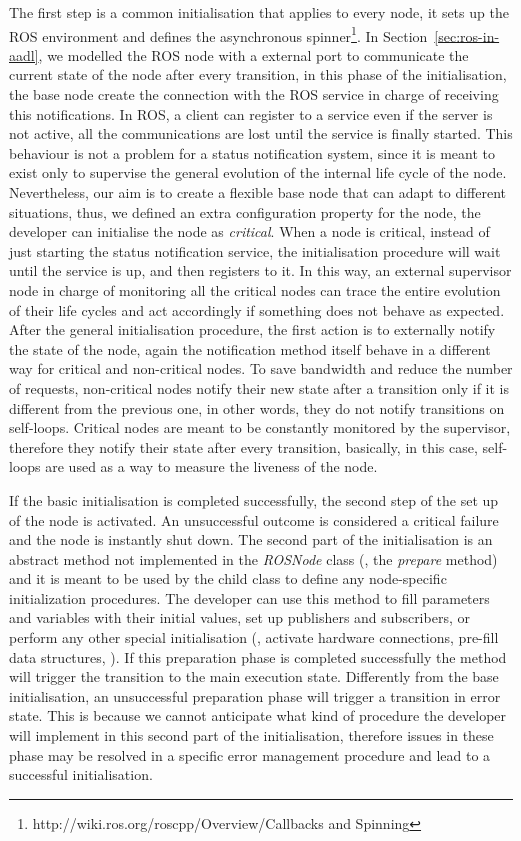 The first step is a common initialisation that applies to every node, it sets up the ROS environment and defines the asynchronous spinner\footnote{http://wiki.ros.org/roscpp/Overview/Callbacks and Spinning}. In Section~\ref{sec:ros-in-aadl}, we modelled the ROS node with a external port to communicate the current state of the node after every transition, in this phase of the initialisation, the base node create the connection with the ROS service in charge of receiving this notifications. In ROS, a client can register to a service even if the server is not active, all the communications are lost until the service is finally started. This behaviour is not a problem for a status notification system, since it is meant to exist only to supervise the general evolution of the internal life cycle of the node. Nevertheless, our aim is to create a flexible base node that can adapt to different situations, thus, we defined an extra configuration property for the node, the developer can initialise the node as \textit{critical}. When a node is critical, instead of just starting the status notification service, the initialisation procedure will wait until the service is up, and then registers to it. In this way, an external supervisor node in charge of monitoring all the critical nodes can trace the entire evolution of their life cycles and act accordingly if something does not behave as expected. After the general initialisation procedure, the first action is to externally notify the state of the node, again the notification method itself behave in a different way for critical and non-critical nodes. To save bandwidth and reduce the number of requests, non-critical nodes notify their new state after a transition only if it is different from the previous one, in other words, they do not notify transitions on self-loops. Critical nodes are meant to be constantly monitored by the supervisor, therefore they notify their state after every transition, basically, in this case, self-loops are used as a way to measure the liveness of the node.

If the basic initialisation is completed successfully, the second step of the set up of the node is activated. An unsuccessful outcome is considered a critical failure and the node is instantly shut down. The second part of the initialisation is an abstract method not implemented in the \textit{ROSNode} class (\ie, the \textit{prepare} method) and it is meant to be used by the child class to define any node-specific initialization procedures. The developer can use this method to fill parameters and variables with their initial values, set up publishers and subscribers, or perform any other special initialisation (\eg, activate hardware connections, pre-fill data structures, \etc). If this preparation phase is completed successfully the method will trigger the transition to the main execution state. Differently from the base initialisation, an unsuccessful preparation phase will trigger a transition in error state. This is because we cannot anticipate what kind of procedure the developer will implement in this second part of the initialisation, therefore issues in these phase may be resolved in a specific error management procedure and lead to a successful initialisation.

